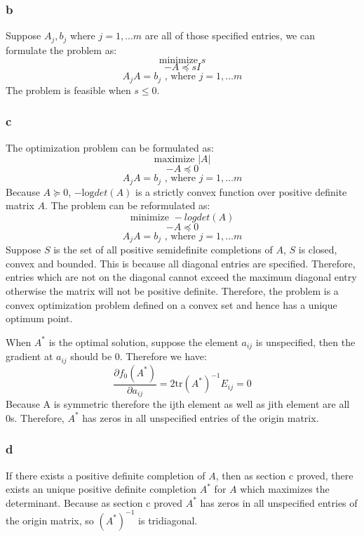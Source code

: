 \message{ !name(ass3_ChangLi.tex)}\documentclass[10pt,a4paper]{article}
\begin{document}
\subsubsection{b}
Suppose $A_j, b_j$ where $j=1,...m$ are all of those
specified entries, we can formulate the problem as:
$$
\text{minimize } s
$$
$$
-A\preceq sI
$$
$$
A_jA=b_j \text{  , where } j=1,\dots m
$$
The problem is feasible when $s\leq0$.

\subsubsection{c}
The optimization problem can be formulated as:
$$
\text{maximize } |A|
$$
$$
-A\preceq 0
$$
$$
A_jA=b_j \text{  , where } j=1,\dots m
$$
Because $A\succeq0$, $-\text{log}det(A)$ is a strictly
convex function over positive definite matrix $A$. The
problem can be reformulated as:
$$
\text{minimize } -logdet(A)
$$
$$
-A\preceq 0
$$
$$
A_jA=b_j \text{  , where } j=1,\dots m
$$
Suppose $S$ is the set of all positive semidefinite
completions of $A$, $S$ is closed, convex and bounded. This
is because all diagonal entries are specified. Therefore,
entries which are not on the diagonal cannot exceed the
maximum diagonal entry otherwise the matrix will not be
positive definite. Therefore, the problem is a convex
optimization problem defined on a convex set and hence has a
unique optimum point.

When $A^*$ is the optimal solution, suppose the element
$a_{ij}$ is unspecified, then the gradient at $a_{ij}$
should be $0$. Therefore we have:
$$
\frac{\partial f_0(A^*)}{\partial a_{ij}} = 2\text{tr}(A^*)^{-1}E_{ij}=0
$$
Because A is symmetric therefore the ijth element as well as
jith element are all 0s. Therefore, $A^*$ has zeros in
all unspecified entries of the origin matrix.


\subsubsection{d}
If there exists a positive definite completion of $A$, then
as section c proved, there exists an unique positive
definite completion $A^*$ for $A$ which maximizes the
determinant. Because as section c proved $A^*$ has zeros in
all unspecified entries of the origin matrix, so
$(A^*)^{-1}$ is tridiagonal.
\end{document}
